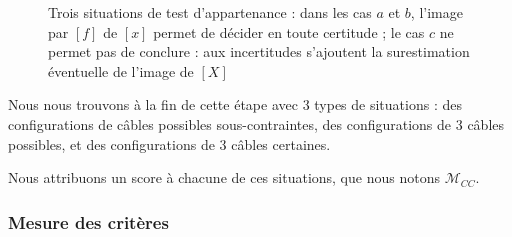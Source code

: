 \begin{figure}[!htp]
  \centering
\hfill
\hfill
    \caption{\footnotesize{Trois situations de test d'appartenance : dans les 
cas $a$ et $b$, l'image par $[f]$ de $[x]$ permet de d\'ecider en toute 
certitude ; le cas $c$ ne permet pas de conclure : aux incertitudes s'ajoutent 
la surestimation \'eventuelle de l'image de $[X]$}}
\label{chap01:fig06}
\end{figure}

Nous nous trouvons \`a la fin de cette \'etape avec $3$ types de situations : 
des configurations de c\^ables possibles sous-contraintes, des configurations 
de $3$ c\^ables possibles, et des configurations de $3$ c\^ables certaines.

Nous attribuons un score \`a chacune de ces situations, que nous notons 
$\mathcal M_{CC}$.

\subsubsection{Mesure des crit\`eres}

